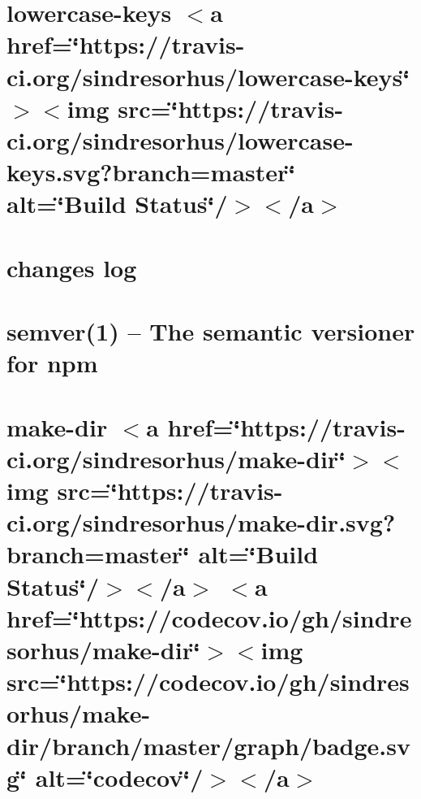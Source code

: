 \let\mypdfximage\pdfximage\def\pdfximage{\immediate\mypdfximage}\documentclass[twoside]{book}
\newcommand{\+}{\discretionary{\mbox{\scriptsize$\hookleftarrow$}}{}{}}
\begin{document}
\chapter{lowercase-\/keys $<$a href=\char`\"{}https\+://travis-\/ci.\+org/sindresorhus/lowercase-\/keys\char`\"{}$>$$<$img src=\char`\"{}https\+://travis-\/ci.\+org/sindresorhus/lowercase-\/keys.\+svg?branch=master\char`\"{} alt=\char`\"{}\+Build Status\char`\"{}/$>$$<$/a$>$}
\label{md__c_1__git_hub__p_r_o_y_e_c_t_o-_i_i_i-_g_o_t_rest-api-node-mysql_node_modules_lowercase-keys_readme}

\chapter{changes log}
\label{md__c_1__git_hub__p_r_o_y_e_c_t_o-_i_i_i-_g_o_t_rest-api-node-mysql_node_modules_make-dir_node_m3d18e2462937f9d20147cb3cc6011881}

\chapter{semver(1) -- The semantic versioner for npm}
\label{md__c_1__git_hub__p_r_o_y_e_c_t_o-_i_i_i-_g_o_t_rest-api-node-mysql_node_modules_make-dir_node_modules_semver__r_e_a_d_m_e}

\chapter{make-\/dir $<$a href=\char`\"{}https\+://travis-\/ci.\+org/sindresorhus/make-\/dir\char`\"{}$>$$<$img src=\char`\"{}https\+://travis-\/ci.\+org/sindresorhus/make-\/dir.\+svg?branch=master\char`\"{} alt=\char`\"{}\+Build Status\char`\"{}/$>$$<$/a$>$ $<$a href=\char`\"{}https\+://codecov.\+io/gh/sindresorhus/make-\/dir\char`\"{}$>$$<$img src=\char`\"{}https\+://codecov.\+io/gh/sindresorhus/make-\/dir/branch/master/graph/badge.\+svg\char`\"{} alt=\char`\"{}codecov\char`\"{}/$>$$<$/a$>$}
\label{md__c_1__git_hub__p_r_o_y_e_c_t_o-_i_i_i-_g_o_t_rest-api-node-mysql_node_modules_make-dir_readme}

\end{document}
